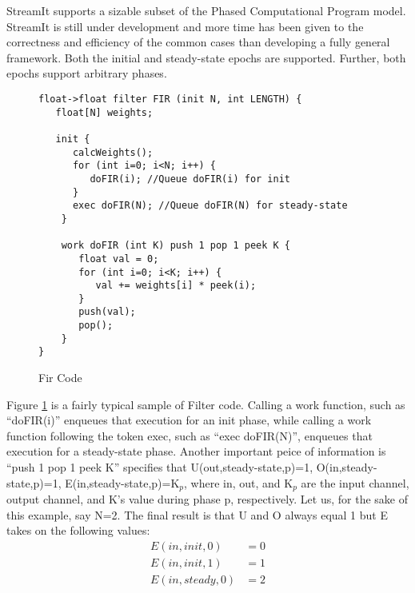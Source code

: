 StreamIt supports a sizable subset of the Phased Computational Program model. StreamIt is still under development and more time has been given to the correctness and efficiency of the common cases than developing a fully general framework. Both the initial and steady-state epochs are supported. Further, both epochs support arbitrary phases.
\begin{figure}[t]
\begin{verbatim}
float->float filter FIR (init N, int LENGTH) {
   float[N] weights;

   init {
      calcWeights();
      for (int i=0; i<N; i++) {
         doFIR(i); //Queue doFIR(i) for init
      }
      exec doFIR(N); //Queue doFIR(N) for steady-state
    }

    work doFIR (int K) push 1 pop 1 peek K {
       float val = 0;
       for (int i=0; i<K; i++) {
          val += weights[i] * peek(i);
       }
       push(val);
       pop();
    }
}
\end{verbatim}
\caption{Fir Code
\protect\label{fig:fir}}
\end{figure}

Figure \ref{fig:fir} is a fairly typical sample of Filter code. Calling a work function, such as ``doFIR(i)'' enqueues that execution for an init phase, while calling a work function following the token exec, such as ``exec doFIR(N)'', enqueues that execution for a steady-state phase. Another important peice of information is ``push 1 pop 1 peek K'' specifies that U(out,steady-state,p)=1, O(in,steady-state,p)=1, E(in,steady-state,p)=K$_p$, where in, out, and K$_p$ are the input channel, output channel, and K's value during phase p, respectively. Let us, for the sake of this example, say N=2. The final result is that U and O always equal 1 but E takes on the following values:
\begin{align}
E(in,init,0)&=0\nonumber\\
E(in,init,1)&=1\nonumber\\
E(in,steady,0)&=2\nonumber
\end{align}

